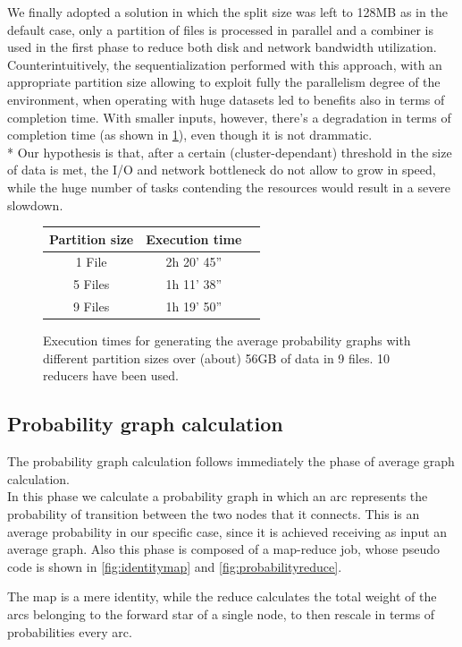 We finally adopted a solution in which the split size was left to 128MB as in the default case, only a partition of files is processed in parallel and a combiner is used in the first phase to reduce both disk and network bandwidth utilization.
Counterintuitively, the sequentialization performed with this approach, with an appropriate partition size allowing to exploit fully the parallelism degree of the environment, when operating with huge datasets led to benefits also in terms of completion time. 
With smaller inputs, however, there's a degradation in terms of completion time (as shown in \ref{fig:partitioningtimes}), even though it is not drammatic.
\\*
Our hypothesis is that, after a certain (cluster-dependant) threshold in the size of data is met, the I/O and network bottleneck do not allow to grow in speed, while the huge number of tasks contending the resources would result in a severe slowdown.

\begin{figure}
\centering
\begin{tabular}{| c | c | r |}
\hline
\textbf{Partition size} & \textbf{Execution time} \\
\hline
1 File & 2h 20' 45'' \\
\hline
5 Files &  1h 11' 38''\\
\hline
9 Files & 1h 19' 50'' \\
\hline
\end{tabular}
\caption{Execution times for generating the average probability graphs with different partition sizes over (about) 56GB of data in 9 files. 10 reducers have been used.}
\label{fig:partitioningtimes}
\end{figure}


\subsection{Probability graph calculation}
The probability graph calculation follows immediately the phase of average graph calculation.\\
In this phase we calculate a probability graph in which an arc represents the probability of transition between the two nodes that it connects. 
This is an average probability in our specific case, since it is achieved receiving as input an average graph.
Also this phase is composed of a map-reduce job, whose pseudo code is shown in \ref{fig:identitymap} and \ref{fig:probabilityreduce}.

The map is a mere identity, while the reduce calculates the total weight of the arcs belonging to the forward star of a single node, to then rescale in terms of probabilities every arc.
  
